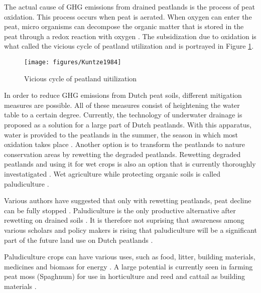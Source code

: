 \documentclass[a4paper,12pt]{scrbook}
\begin{document}
The actual cause of \ac{GHG} emissions from drained peatlands is the process of peat oxidation. This process occurs when peat is aerated. When oxygen can enter the peat, micro organisms can decompose the organic matter that is stored in the peat through a redox reaction with oxygen \citep{erkens2016double}. The subsidization due to oxidation is what \citet{kuntze1984bewirtschaftung} called the vicious cycle of peatland utilization and is portrayed in Figure \ref{fig:peatlanduti}.

\begin{figure}
    \centering
    \texttt{[image: figures/Kuntze1984]} 
    \caption{Vicious cycle of peatland uitilization}
    \label{fig:peatlanduti}
\end{figure}

In order to reduce GHG emissions from Dutch peat soils, different mitigation measures are possible. All of these measures consist of heightening the water table to a certain degree. Currently, the technology of underwater drainage is proposed as a solution for a large part of Dutch peatlands. With this apparatus, water is provided to the peatlands in the summer, the season in which most oxidation takes place \citep{van2011huidige}. Another option is to transform the peatlands to nature conservation areas by rewetting the degraded peatlands. Rewetting degraded peatlands and using it for wet crops is also an option that is currently thoroughly investatigated \citep{Wichmann20151063}. Wet agriculture while protecting organic soils is called paludiculture \citep{joosten2002wise}. 

Various authors have suggested that only with rewetting peatlands, peat decline can be fully stopped \citep{van2016dalende, wichtmann2016paludiculture}. Paludiculture is the only productive alternative after rewetting on drained soils \citep{wichtmann2016paludiculture}. It is therefore not suprising that awareness among various scholars and policy makers is rising that paludiculture will be a significant part of the future land use on Dutch peatlands \citep{abel2013database, wichtmann2016paludiculture, Wichmann20151063}. 

Paludiculture crops can have various uses, such as food, litter, building materials, medicines and biomass for energy \citep{wichtmann2016paludiculture}. A large potential is currently seen in farming peat moss (Spaghnum) for use in horticulture and reed and cattail as building materials \citep{wichtmann2016paludiculture}.
\end{document}
